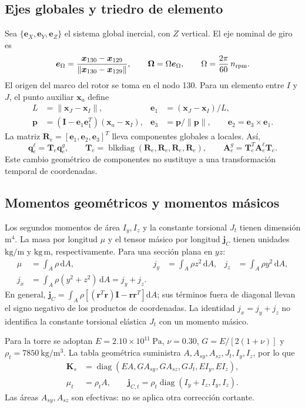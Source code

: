 \documentclass[oneside,a4paper,spanish,links,pagenumbers]{amca}
\newcommand{\dd}{\mathrm{d}}
\newcommand{\I}{\bm I}
\newcommand{\diag}{\operatorname{diag}}
\newcommand{\blkdiag}{\operatorname{blkdiag}}
\begin{document}
\subsection{Ejes globales y triedro de elemento}
Sea $\{\bm e_X,\bm e_Y,\bm e_Z\}$ el sistema global inercial, con $Z$ vertical. El eje nominal de giro es
\begin{equation}
\bm e_\Omega=\frac{\bm x_{130}-\bm x_{129}}
{\|\bm x_{130}-\bm x_{129}\|},\qquad
\bm\Omega=\Omega\bm e_\Omega,\qquad
\Omega=\frac{2\pi}{60}\,n_{\rm rpm}.
\end{equation}
El origen del marco del rotor se toma en el nodo 130. Para un elemento entre $I$ y $J$, el punto auxiliar $\bm x_a$ define
\begin{align}
L&=\|\bm x_J-\bm x_I\|, &
\bm e_1&=(\bm x_J-\bm x_I)/L,\\
\bm p&=(\I-\bm e_1\bm e_1^T)(\bm x_a-\bm x_I),&
\bm e_3&=\bm p/\|\bm p\|,\qquad \bm e_2=\bm e_3\times\bm e_1.
\end{align}
La matriz $\bm R_e=[\bm e_1,\bm e_2,\bm e_3]^T$ lleva componentes globales a locales. Así,
\begin{equation}
\bm q_e^\ell=\bm T_e\bm q_e^g,
\qquad \bm T_e=\blkdiag(\bm R_e,\bm R_e,\bm R_e,\bm R_e),
\qquad \bm A_e^g=\bm T_e^T\bm A_e^\ell\bm T_e.
\end{equation}
Este cambio geométrico de componentes no sustituye a una transformación temporal de coordenadas.

\subsection{Momentos geométricos y momentos másicos}
Los segundos momentos de área $I_y,I_z$ y la constante torsional $J_t$ tienen dimensión $\mathrm{m^4}$. La masa por longitud $\mu$ y el tensor másico por longitud $\bm j_C$ tienen unidades $\mathrm{kg/m}$ y $\mathrm{kg\,m}$, respectivamente. Para una sección plana en $yz$:
\begin{align}
\mu&=\int_A\rho\,\dd A,&
j_y&=\int_A\rho z^2\,\dd A,&
j_z&=\int_A\rho y^2\,\dd A,\\
j_x&=\int_A\rho(y^2+z^2)\,\dd A=j_y+j_z.
\end{align}
En general, $\bm j_C=\int_A\rho[(\bm r^T\bm r)\I-\bm r\bm r^T]\dd A$; sus términos fuera de diagonal llevan el signo negativo de los productos de coordenadas. La identidad $j_x=j_y+j_z$ no identifica la constante torsional elástica $J_t$ con un momento másico.

Para la torre se adoptan $E=2.10\times10^{11}\ \mathrm{Pa}$, $\nu=0.30$, $G=E/[2(1+\nu)]$ y $\rho_t=7850\ \mathrm{kg/m^3}$. La tabla geométrica suministra $A,A_{sy},A_{sz},J_t,I_y,I_z$, por lo que
\begin{align}
\bm K_s&=\diag(EA,GA_{sy},GA_{sz},GJ_t,EI_y,EI_z),\\
\mu_t&=\rho_t A,\qquad
\bm j_{C,t}=\rho_t\diag(I_y+I_z,I_y,I_z).
\end{align}
Las áreas $A_{sy},A_{sz}$ son efectivas: no se aplica otra corrección cortante.
\end{document}
